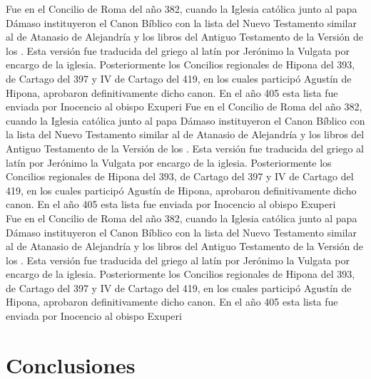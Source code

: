 \documentclass[a4paper,12pt]{article}
\begin{document}
Fue en el Concilio de Roma del año 382, cuando la Iglesia católica junto al papa Dámaso instituyeron el Canon Bíblico con la lista del Nuevo Testamento similar al de Atanasio de Alejandría y los libros del Antiguo Testamento de la Versión de los . Esta versión fue traducida del griego al latín por Jerónimo la Vulgata por encargo de la iglesia. Posteriormente los Concilios regionales de Hipona del 393,  de Cartago del 397 y IV de Cartago del 419, en los cuales participó Agustín de Hipona, aprobaron definitivamente dicho canon. En el año 405 esta lista fue enviada por Inocencio al obispo Exuperi
Fue en el Concilio de Roma del año 382, cuando la Iglesia católica junto al papa Dámaso instituyeron el Canon Bíblico con la lista del Nuevo Testamento similar al de Atanasio de Alejandría y los libros del Antiguo Testamento de la Versión de los . Esta versión fue traducida del griego al latín por Jerónimo la Vulgata por encargo de la iglesia. Posteriormente los Concilios regionales de Hipona del 393,  de Cartago del 397 y IV de Cartago del 419, en los cuales participó Agustín de Hipona, aprobaron definitivamente dicho canon. En el año 405 esta lista fue enviada por Inocencio al obispo Exuperi\\
Fue en el Concilio de Roma del año 382, cuando la Iglesia católica junto al papa Dámaso instituyeron el Canon Bíblico con la lista del Nuevo Testamento similar al de Atanasio de Alejandría y los libros del Antiguo Testamento de la Versión de los . Esta versión fue traducida del griego al latín por Jerónimo la Vulgata por encargo de la iglesia. Posteriormente los Concilios regionales de Hipona del 393,  de Cartago del 397 y IV de Cartago del 419, en los cuales participó Agustín de Hipona, aprobaron definitivamente dicho canon. En el año 405 esta lista fue enviada por Inocencio al obispo Exuperi\\


\section{Conclusiones}
\end{document}
